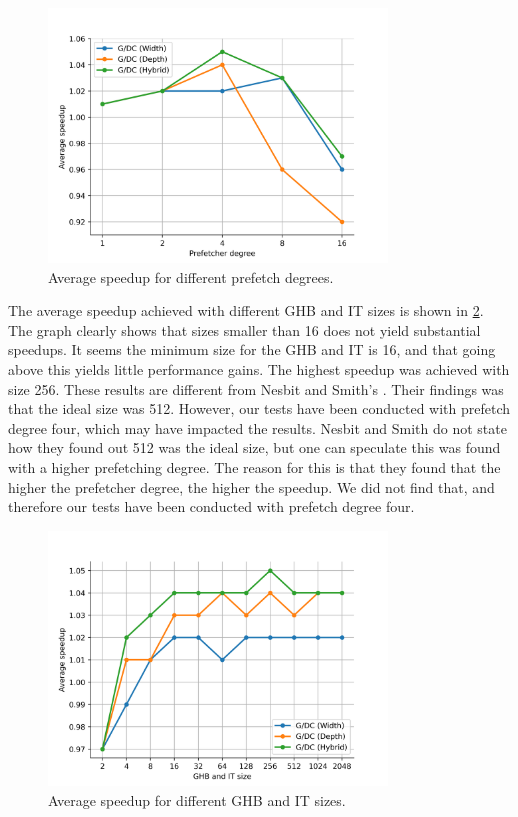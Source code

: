 \documentclass[conference]{IEEEtran}
\begin{document}
\begin{figure}[H]
    \centering
    \vspace{-3mm}
     \includegraphics[width=90mm]{assets/speedup.png}
    \vspace{-7mm}
    \caption{Average speedup for different prefetch degrees.}
    \label{fig:speedup}
    \vspace{3mm}
\end{figure}

The average speedup achieved with different GHB and IT sizes is shown in \cref{fig:size}. The graph clearly shows that sizes smaller than 16 does not yield substantial speedups. It seems the minimum size for the GHB and IT is 16, and that going above this yields little performance gains. The highest speedup was achieved with size 256. These results are different from Nesbit and Smith's \cite{b1}. Their findings was that the ideal size was 512. However, our tests have been conducted with prefetch degree four, which may have impacted the results. Nesbit and Smith do not state how they found out 512 was the ideal size, but one can speculate this was found with a higher prefetching degree. The reason for this is that they found that the higher the prefetcher degree, the higher the speedup. We did not find that, and therefore our tests have been conducted with prefetch degree four. 

\begin{figure}[H]
    \centering
    \vspace{-3mm}
     \includegraphics[width=90mm]{assets/size.png}
    \vspace{-7mm}
    \caption{Average speedup for different GHB and IT sizes.}
    \label{fig:size}
    \vspace{3mm}
\end{figure}
\end{document}
